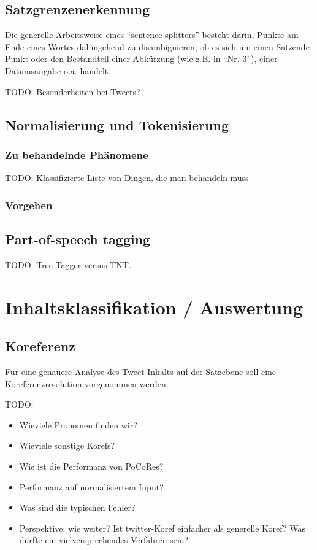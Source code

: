 \documentclass[11pt]{article}
\begin{document}
\subsection{Satzgrenzenerkennung}

Die generelle Arbeitsweise eines ``sentence splitters'' besteht darin,
Punkte am Ende eines Wortes dahingehend zu disambiguieren, ob es sich
um einen Satzende-Punkt oder den Bestandteil einer Abkürzung (wie
z.B. in ``Nr. 3''), einer Datumsangabe o.ä. handelt.

TODO: Besonderheiten bei Tweets?


\subsection{Normalisierung und Tokenisierung}

\subsubsection{Zu behandelnde Phänomene}

TODO: Klassifizierte Liste von Dingen, die man behandeln muss

\subsubsection{Vorgehen}


\subsection{Part-of-speech tagging}

TODO: Tree Tagger versus TNT.

\section{Inhaltsklassifikation / Auswertung}

\subsection{Koreferenz}
Für eine genauere Analyse des Tweet-Inhalts auf der Satzebene soll
eine Koreferenzresolution vorgenommen werden.

TODO:
\begin{itemize}
\item Wieviele Pronomen finden wir?
\item Wieviele sonstige Korefs?
\item Wie ist die Performanz von PoCoRes?
\item Performanz auf normalisiertem Input?
\item Was sind die typischen Fehler?
\item Perspektive: wie weiter? Ist twitter-Koref einfacher als
  generelle Koref? Was dürfte ein vielversprechendes Verfahren sein?
\end{itemize}
\end{document}
